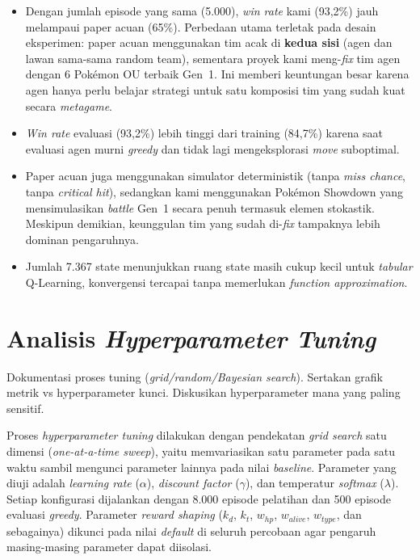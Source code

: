 \documentclass[11pt,a4paper,oneside]{report}
\begin{document}
\begin{itemize}[leftmargin=*]
    \item Dengan jumlah episode yang sama (5.000), \textit{win rate} kami (93,2\%) jauh melampaui paper acuan (65\%). Perbedaan utama terletak pada desain eksperimen: paper acuan menggunakan tim acak di \textbf{kedua sisi} (agen dan lawan sama-sama random team), sementara proyek kami meng-\textit{fix} tim agen dengan 6 Pokémon OU terbaik Gen~1. Ini memberi keuntungan besar karena agen hanya perlu belajar strategi untuk satu komposisi tim yang sudah kuat secara \textit{metagame}.
    \item \textit{Win rate} evaluasi (93,2\%) lebih tinggi dari training (84,7\%) karena saat evaluasi agen murni \textit{greedy} dan tidak lagi mengeksplorasi \textit{move} suboptimal.
    \item Paper acuan juga menggunakan simulator deterministik (tanpa \textit{miss chance}, tanpa \textit{critical hit}), sedangkan kami menggunakan Pokémon Showdown yang mensimulasikan \textit{battle} Gen~1 secara penuh termasuk elemen stokastik. Meskipun demikian, keunggulan tim yang sudah di-\textit{fix} tampaknya lebih dominan pengaruhnya.
    \item Jumlah 7.367 state menunjukkan ruang state masih cukup kecil untuk \textit{tabular} Q-Learning, konvergensi tercapai tanpa memerlukan \textit{function approximation}.
\end{itemize}

\section{Analisis \textit{Hyperparameter Tuning}}
\begin{petunjuk}
Dokumentasi proses tuning (\textit{grid/random/Bayesian search}). Sertakan grafik metrik vs hyperparameter kunci. Diskusikan hyperparameter mana yang paling sensitif.
\end{petunjuk}

Proses \textit{hyperparameter tuning} dilakukan dengan pendekatan \textit{grid search} satu dimensi (\textit{one-at-a-time sweep}), yaitu memvariasikan satu parameter pada satu waktu sambil mengunci parameter lainnya pada nilai \textit{baseline}. Parameter yang diuji adalah \textit{learning rate} ($\alpha$), \textit{discount factor} ($\gamma$), dan temperatur \textit{softmax} ($\lambda$). Setiap konfigurasi dijalankan dengan 8.000 episode pelatihan dan 500 episode evaluasi \textit{greedy}. Parameter \textit{reward shaping} ($k_d$, $k_t$, $w_{hp}$, $w_{alive}$, $w_{type}$, dan sebagainya) dikunci pada nilai \textit{default} di seluruh percobaan agar pengaruh masing-masing parameter dapat diisolasi.
\end{document}
